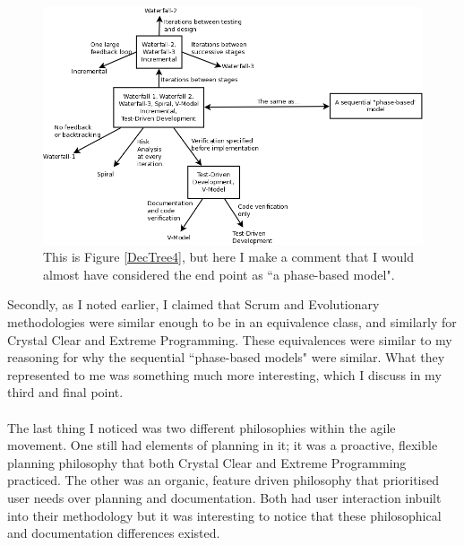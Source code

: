 \begin{figure}[ht!]
  \centering
  \includegraphics[scale=0.35]{media/DecisionTreeAllEqual}
  \caption{This is Figure \ref{DecTree4}, but here I make a comment that I
  would almost have considered the end point as ``a phase-based model".}
  \label{DecTreeAll}
\end{figure}

Secondly, as I noted earlier, I claimed that Scrum and Evolutionary
methodologies were similar enough to be in an equivalence class, and similarly
for Crystal Clear and Extreme Programming.
These equivalences were similar to my reasoning for why the sequential
``phase-based models" were similar.
What they represented to me was something much more interesting, which I discuss
in my third and final point.\\
\\
The last thing I noticed was two different philosophies within the agile
movement.
One still had elements of planning in it; it was a proactive, flexible planning
philosophy that both Crystal Clear and Extreme Programming practiced.
The other was an organic, feature driven philosophy that prioritised user needs
over planning and documentation.
Both had user interaction inbuilt into their methodology but it was interesting
to notice that these philosophical and documentation differences existed.

